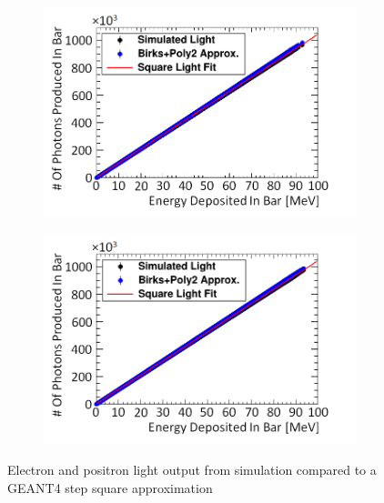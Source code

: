 \begin{figure}[!h]
\centering
\begin{subfigure}{.5\textwidth}
  \centering
  \includegraphics[width=\linewidth]{Chapter4/Figs/e-Birks-Poly2Slab_simAndApproxLightMedText.png}
  \captionsetup{width=.9\linewidth}
  \caption{}
  \label{subFig:square_electron_light}
\end{subfigure}%
\begin{subfigure}{.5\textwidth}
  \centering
  \includegraphics[width=\linewidth]{Chapter4/Figs/e+Birks-Poly2Slab_simAndApproxLightMedText.png}
  \captionsetup{width=.9\linewidth}
  \caption{}
  \label{subFig:square_positron_light}
\end{subfigure}
\caption{Electron and positron light output from simulation compared to a GEANT4 step square approximation}
\label{fig:square_electron_positron_light}
\end{figure}

